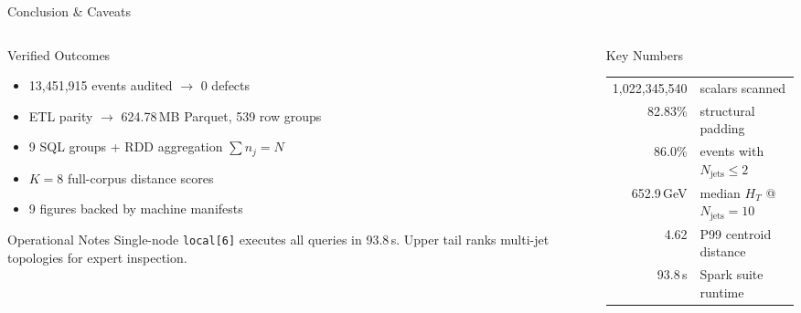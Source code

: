 \documentclass[aspectratio=169]{beamer}
\newcommand{\HT}{H_{T}}
\newcommand{\njet}{N_{\mathrm{jets}}}
\begin{document}
\begin{frame}{Conclusion \& Caveats}
  \begin{columns}[T]
    \begin{column}{0.54\textwidth}
      \begin{block}{Verified Outcomes}
        \tiny
        \begin{itemize}
          \item 13{,}451{,}915 events audited $\rightarrow$ 0 defects
          \item ETL parity $\rightarrow$ 624.78\,MB Parquet, 539 row groups
          \item 9 SQL groups + RDD aggregation $\sum n_j = N$ \checkmark
          \item $K{=}8$ full-corpus distance scores
          \item 9 figures backed by machine manifests
        \end{itemize}
      \end{block}
      \begin{exampleblock}{Operational Notes}
        \tiny Single-node \texttt{local[6]} executes all queries in 93.8\,s. Upper tail ranks multi-jet topologies for expert inspection.
      \end{exampleblock}
    \end{column}
    \begin{column}{0.42\textwidth}
      \begin{exampleblock}{Key Numbers}
        \centering
        \tiny
        \begin{tabular}{r@{\ }l}
          \toprule
          1{,}022{,}345{,}540 & scalars scanned \\
          82.83\% & structural padding \\
          86.0\% & events with $\njet\le2$ \\
          652.9\,GeV & median $\HT$ @ $\njet{=}10$ \\
          4.62 & P99 centroid distance \\
          93.8\,s & Spark suite runtime \\
          \bottomrule
        \end{tabular}
      \end{exampleblock}
      \vspace{0.1cm}
    \end{column}
  \end{columns}
\end{frame}
\end{document}

